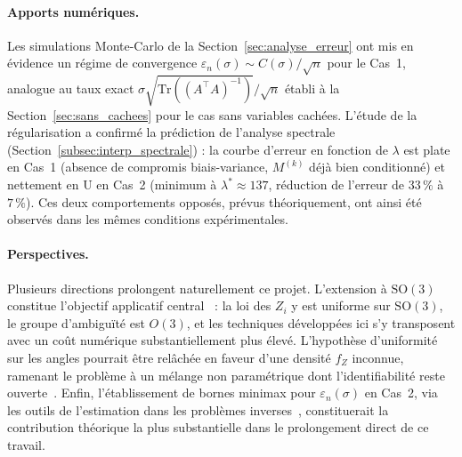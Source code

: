\documentclass[12pt, a4paper]{article}
\theoremstyle{definition}
\newcommand{\Tr}{\mathrm{Tr}}
\begin{document}
\paragraph{Apports numériques.}
Les simulations Monte-Carlo de la Section~\ref{sec:analyse_erreur} ont mis en
évidence un régime de convergence $\varepsilon_n(\sigma) \sim C(\sigma)/\sqrt{n}$
pour le Cas~1, analogue au taux exact $\sigma\sqrt{\Tr((A^\top A)^{-1})}/\sqrt{n}$
établi à la Section~\ref{sec:sans_cachees} pour le cas sans variables cachées.
L'étude de la régularisation a confirmé la prédiction de l'analyse spectrale
(Section~\ref{subsec:interp_spectrale}) : la courbe d'erreur en fonction de
$\lambda$ est plate en Cas~1 (absence de compromis biais-variance, $M^{(k)}$
déjà bien conditionné) et nettement en U en Cas~2 (minimum à $\lambda^*\approx 137$,
réduction de l'erreur de $33\,\%$ à $7\,\%$). Ces deux comportements opposés,
prévus théoriquement, ont ainsi été observés dans les mêmes conditions expérimentales.

\paragraph{Perspectives.}
Plusieurs directions prolongent naturellement ce projet. L'extension à $\mathrm{SO}(3)$
constitue l'objectif applicatif central~\cite{frank2006three, singer2011three} :
la loi des $Z_i$ y est uniforme sur $\mathrm{SO}(3)$, le groupe d'ambiguïté est
$O(3)$, et les techniques développées ici s'y transposent avec un coût numérique
substantiellement plus élevé. L'hypothèse d'uniformité sur les angles pourrait
être relâchée en faveur d'une densité $f_Z$ inconnue, ramenant le problème à un
mélange non paramétrique dont l'identifiabilité reste ouverte~\cite{singer2011three}.
Enfin, l'établissement de bornes minimax pour $\varepsilon_n(\sigma)$ en Cas~2,
via les outils de l'estimation dans les problèmes inverses~\cite{cavalier2008inverse},
constituerait la contribution théorique la plus substantielle dans le prolongement
direct de ce travail.


\newpage


\end{document}
